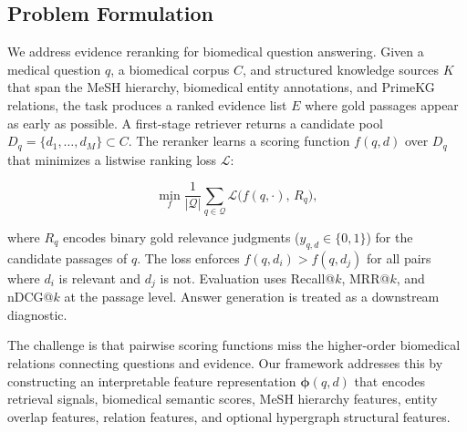 \subsection{Problem Formulation}

We address evidence reranking for biomedical question answering. Given a medical question $q$, a biomedical corpus $C$, and structured knowledge sources $K$ that span the MeSH hierarchy, biomedical entity annotations, and PrimeKG relations, the task produces a ranked evidence list $E$ where gold passages appear as early as possible. A first-stage retriever returns a candidate pool $D_q = \{d_1,\ldots,d_M\} \subset C$. The reranker learns a scoring function $f(q,d)$ over $D_q$ that minimizes a listwise ranking loss $\mathcal{L}$:

\[
  \min_f \frac{1}{|\mathcal{Q}|}\sum_{q \in \mathcal{Q}} \mathcal{L}\big(f(q,\cdot),\, R_q\big),
\]

where $R_q$ encodes binary gold relevance judgments ($y_{q,d} \in \{0,1\}$) for the candidate passages of $q$. The loss enforces $f(q,d_i) > f(q,d_j)$ for all pairs where $d_i$ is relevant and $d_j$ is not. Evaluation uses Recall@$k$, MRR@$k$, and nDCG@$k$ at the passage level. Answer generation is treated as a downstream diagnostic.

The challenge is that pairwise scoring functions miss the higher-order biomedical relations connecting questions and evidence. Our framework addresses this by constructing an interpretable feature representation $\boldsymbol{\phi}(q,d)$ that encodes retrieval signals, biomedical semantic scores, MeSH hierarchy features, entity overlap features, relation features, and optional hypergraph structural features.
